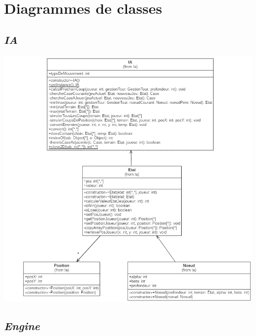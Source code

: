 \documentclass[11pt,a4paper]{article}
\begin{document}
\newpage
\section{Diagrammes de classes}

\subsection{\textit{IA}}
\vspace{40px}

\begin{center}
\includegraphics[width=1\textwidth]{UML/IA.png}
\end{center}

\newpage
\subsection{\textit{Engine}}
\vspace{40px}
\end{document}
